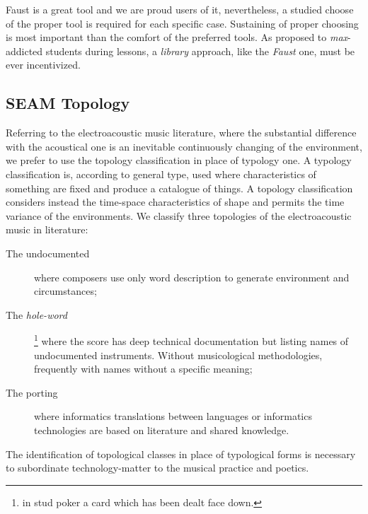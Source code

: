 \documentclass[twoside,a4paper]{article}
\begin{document}
Faust is a great tool and we are proud users of it, nevertheless, a studied
choose of the proper tool is required for each specific case. Sustaining of
proper choosing is most important than the comfort of the preferred tools. As
proposed to \emph{max}-addicted students during lessons, a \emph{library}
approach, like the \emph{Faust} one, must be ever incentivized.


\subsection{SEAM Topology}

Referring to the electroacoustic music literature, where the substantial
difference with the acoustical one is an inevitable continuously changing of the
environment, we prefer to use the topology classification in place of typology
one. A typology classification is, according to general type, used where
characteristics of something are fixed and produce a catalogue of things. A
topology classification considers instead the time-space characteristics of
shape and permits the time variance of the environments. We classify three
topologies of the electroacoustic music in literature:

\begin{description}
  \item[The undocumented] where composers use only word description to generate
  environment and circumstances;
  \item[The \emph{hole-word}]\footnote{in stud poker a card which has been dealt
  face down.} where the score has deep technical documentation
  but listing names of undocumented instruments. Without musicological
  methodologies, frequently with names without a specific meaning;
  \item[The porting] where informatics translations between languages or
  informatics technologies are based on literature and shared knowledge.
\end{description}

The identification of topological classes in place of typological forms is
necessary to subordinate technology-matter to the musical practice and poetics.

\end{document}
